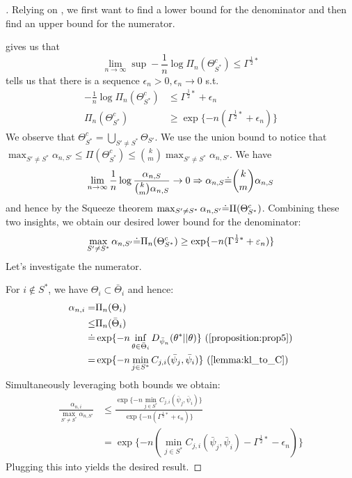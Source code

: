 \begin{proof}[]
  Relying on , we first want to find a
  lower bound for the denominator and then find an upper bound for the
  numerator.

   gives us that
  \[\lim_{n \rightarrow \infty} \sup - \frac{1}{n} \log \Pi_n(\Theta^c_{S^*})
      \leq \Gamma^{\frac{1}{2}*}\]
   tells us that there is a sequence $\epsilon_n > 0,
  \epsilon_n \rightarrow 0$ s.t.
  \begin{align}
    - \frac{1}{n} \log \Pi_n(\Theta^c_{S^*}) &\leq \Gamma^{\frac{1}{2}*} +
        \epsilon_n \label{eq: epsilon}\\
   \Pi_n(\Theta^c_{S^*}) &\geq \exp\{-n (\Gamma^{\frac{1}{2}*} + \epsilon_n)\}
  \end{align}
  We observe that $\Theta^c_{S^*} = \bigcup_{S' \neq S^*} \Theta_{S'}$. We use
  the union bound to notice that $ \max_{S' \neq S^*} \alpha_{n, S'} \leq
  \Pi(\Theta_{S^*}^c) \leq {k \choose m} \max_{S' \neq S^*} \alpha_{n, S'}$. We
  have \[\lim_{n \rightarrow \infty} \frac{1}{n} \log\frac{\alpha_{n, S}}{{k
  \choose m} \alpha_{n, S}} \rightarrow 0 \Rightarrow \alpha_{n, S} \dot{=} {k
  \choose m} \alpha_{n, S}\] and hence by the Squeeze theorem $\max_{S' \neq
  S^*} \alpha_{n, S'} \dot{=} \Pi(\Theta_{S^*}^c)$. Combining these two insights,
  we obtain our desired lower bound for the denominator:
  \[\max_{S' \neq S^*} \alpha_{n, S'} \dot{=} \Pi_n(\Theta^c_{S^*}) \geq \exp\{-n
      (\Gamma^{\frac{1}{2}*} + \varepsilon_n)\}\]
  Let's investigate the numerator.

  For $i \notin S^*$, we have $\Theta_i \subset \bar{\Theta}_i$ and hence:
  \begin{align}
    \alpha_{n,i} =& \Pi_n(\Theta_i) \\
    \leq& \Pi_n(\bar{\Theta}_i) \\
    \deq& \exp\{-n \inf_{\theta \in \bar{\Theta}_i}
        D_{\bar{\psi}_n}(\theta^*||\theta)\} \text{
        (\Cref{proposition:prop5})}\\
    =& \exp\{-n \min_{j \in S^*} C_{j, i}(\bar{\psi}_j, \bar{\psi}_i)\} \text{
        (\Cref{lemma:kl_to_C}) } \label{eq: only_i}
  \end{align}
  Simultaneously leveraging both bounds we obtain:
  \begin{align}
    \frac{\alpha_{n, i}}{\max_{S' \neq S^*} \alpha_{n, S'}} &\leq \frac{\exp\{-
        n \min_{j \in S^*} C_{j, i}(\bar{\psi}_j, \bar{\psi}_i)\}}{ \exp\{-n
        (\Gamma^{\frac{1}{2}*} + \epsilon_n)\}} \\
    &= \exp\{-n( \min_{j \in S^*} C_{j, i}(\bar{\psi}_j, \bar{\psi}_i) -
        \Gamma^{\frac{1}{2}*} - \epsilon_n) \}
  \end{align}
  Plugging this into  yields the desired
  result.
\end{proof}


